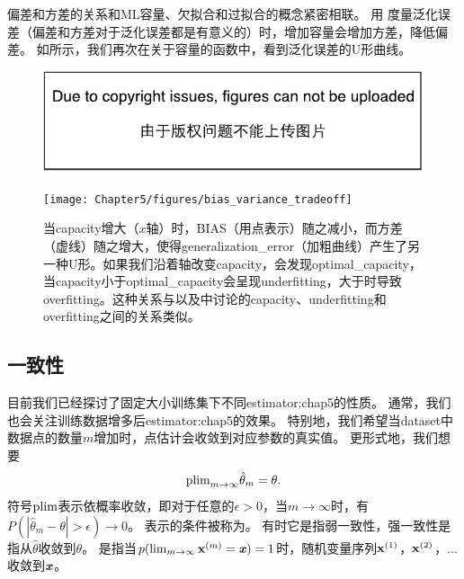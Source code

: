 偏差和方差的关系和\gls{ML}容量、欠拟合和过拟合的概念紧密相联。
用\,\,度量泛化误差（偏差和方差对于泛化误差都是有意义的）时，增加容量会增加方差，降低偏差。
如所示，我们再次在关于容量的函数中，看到泛化误差的U形曲线。

\begin{figure}[!htb]
\ifOpenSource
\centerline{\includegraphics{figure.pdf}}
\else
\centerline{\texttt{[image: Chapter5/figures/bias\_variance\_tradeoff]}}
\fi
\caption{当\gls{capacity}增大（$x$轴）时，\gls{BIAS}（用点表示）随之减小，而方差（虚线）随之增大，使得\gls{generalization_error}（加粗曲线）产生了另一种U形。如果我们沿着轴改变\gls{capacity}，会发现\gls{optimal_capacity}，当\gls{capacity}小于\gls{optimal_capacity}会呈现\gls{underfitting}，大于时导致\gls{overfitting}。这种关系与以及中讨论的\gls{capacity}、\gls{underfitting}和\gls{overfitting}之间的关系类似。}
\label{fig:chap5_bias_variance_tradeoff}
\end{figure}


\subsection{一致性}
\label{sec:consistency}
目前我们已经探讨了固定大小训练集下不同\gls{estimator:chap5}的性质。
通常，我们也会关注训练数据增多后\gls{estimator:chap5}的效果。
特别地，我们希望当\gls{dataset}中数据点的数量$m$增加时，点估计会收敛到对应参数的真实值。
更形式地，我们想要
\begin{equation}
\label{eq:5.55}
    \text{plim}_{m\to\infty} \hat{\theta}_m = \theta.
\end{equation}
符号$\text{plim}$表示依概率收敛，即对于任意的$\epsilon > 0$，当$m\to\infty$时，有$P(|\hat{\theta}_m - \theta| > \epsilon) \to 0$。
表示的条件被称为。
有时它是指弱一致性，强一致性是指从$\hat{\theta}$收敛到$\theta$。
是指当$p(\lim_{m\to\infty} \mathbf{x}^{(m)} = \boldsymbol{\mathit{x}}) = 1 $时，随机变量序列$\mathbf{x}^{(1)}$，$\mathbf{x}^{(2)}$，$\dots$收敛到$\boldsymbol{\mathit{x}}$。

